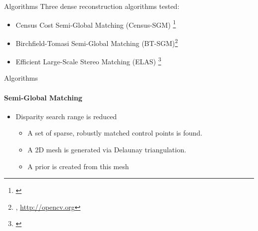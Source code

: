 \begin{frame}{Algorithms}
  Three dense reconstruction algorithms tested:
  \begin{itemize}
   \item Census Cost Semi-Global Matching (Census-SGM) \footnote{\cite{Hirschmuller2005, Hirschmuller2009}}
   \item Birchfield-Tomasi Semi-Global Matching (BT-SGM)\footnote{\cite{Hirschmuller2005, Birchfield1998}, \url{http://opencv.org}}
   \item Efficient Large-Scale Stereo Matching (ELAS) \footnote{\cite{Geiger2011}}
  \end{itemize}


\end{frame}

\begin{frame}{Algorithms}
  \framesubtitle{Semi-Global Matching}
  
  \begin{itemize}
    \item Disparity search range is reduced
    \begin{itemize}
      \item A set of sparse, robustly matched control points is found.
      \item A 2D mesh is generated via Delaunay triangulation.
      \item A prior is created from this mesh
    \end{itemize}
  \end{itemize}

\end{frame}

